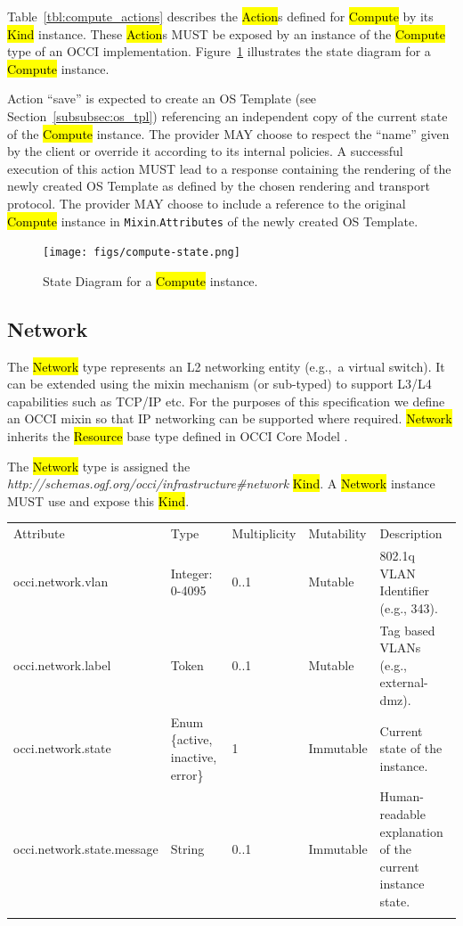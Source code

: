 \documentclass[10pt,a4paper]{article}
\begin{document}
Table~\ref{tbl:compute_actions} describes the \hl{Action}s defined for
\hl{Compute} by its \hl{Kind} instance. These \hl{Action}s MUST be
exposed by an instance of the \hl{Compute} type of an OCCI
implementation.  Figure~\ref{fig:compute_state} illustrates the state
diagram for a \hl{Compute} instance.

Action ``save'' is expected to create an OS Template (see Section~\ref{subsubsec:os_tpl}) referencing
an independent copy of the current state of the \hl{Compute} instance. The provider MAY choose to respect
the ``name'' given by the client or override it according to its internal policies. A successful
execution of this action MUST lead to a response containing the rendering of the newly
created OS Template as defined by the chosen rendering and transport protocol.
The provider MAY choose to include a reference to the original \hl{Compute} instance
in {\tt Mixin}.{\tt Attributes} of the newly created OS Template.

\begin{figure}[!h]
	\centering
	\texttt{[image: figs/compute-state.png]}
	\caption{State Diagram for a \hl{Compute} instance.}
	\label{fig:compute_state}
\end{figure}

\subsection{Network}
The \hl{Network} type represents an L2 networking entity (e.g.,~a
virtual switch). It can be extended using the mixin mechanism (or
sub-typed) to support L3/L4 capabilities such as TCP/IP etc.  For the
purposes of this specification we define an OCCI mixin so that IP
networking can be supported where required. \hl{Network} inherits the
\hl{Resource} base type defined in OCCI Core Model \cite{occi:core}.

The \hl{Network} type is assigned the
\textit{http://schemas.ogf.org/occi/infrastructure\#network}
\hl{Kind}. A \hl{Network} instance MUST use and expose this \hl{Kind}.

{
	\begin{tabular}{lp{2.5cm}p{1cm}lp{5cm}}
	\toprule
	Attribute&Type&Multi\-plicity&Mutability&Description\\
	\colrule
	occi.network.vlan & Integer: 0-4095 & 0..1 & Mutable
	& 802.1q VLAN Identifier (e.g., 343).\\
	occi.network.label & Token & 0..1 & Mutable
	& Tag based VLANs (e.g., external-dmz).\\
	occi.network.state & Enum \{active, inactive, error\} & 1 & Immutable
	& Current state of the instance.\\
	occi.network.state.message & String & 0..1 & Immutable
	& Human-readable explanation of the current instance state.\\
	\botrule
	\end{tabular}
}
\end{document}
